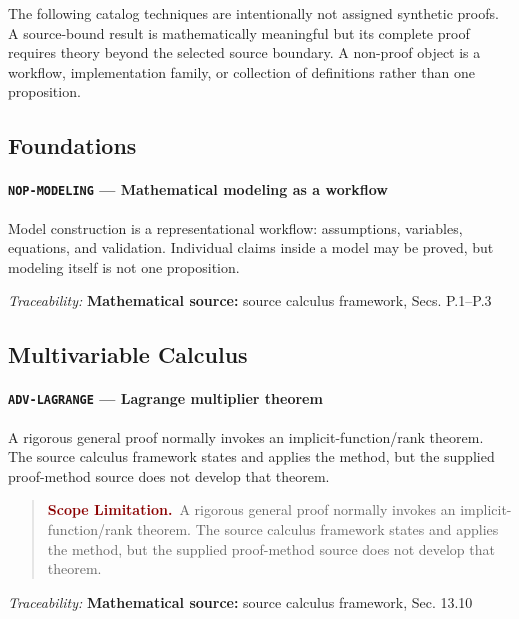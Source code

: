 \documentclass[10pt]{article}
\newcommand{\pidraw}[1]{\begingroup\urlstyle{tt}\nolinkurl{#1}\endgroup}
\theoremstyle{definition}
\theoremstyle{remark}
\newenvironment{scopelimitation}
{\begin{quote}\small\noindent\textbf{\textcolor{darkred}{Scope Limitation.}}\ }
{\end{quote}}
\begin{document}
The following catalog techniques are intentionally not assigned synthetic proofs. A source-bound result is mathematically meaningful but its complete proof requires theory beyond the selected source boundary. A non-proof object is a workflow, implementation family, or collection of definitions rather than one proposition.

\subsection{Foundations}

\label{prf:NOP-MODELING}

\paragraph{\pidraw{NOP-MODELING} --- Mathematical modeling as a workflow}

Model construction is a representational workflow: assumptions, variables, equations, and validation. Individual claims inside a model may be proved, but modeling itself is not one proposition.

\smallskip\noindent\textit{Traceability:} \textbf{Mathematical source:} source calculus framework, Secs. P.1--P.3\par

\subsection{Multivariable Calculus}

\label{prf:ADV-LAGRANGE}

\paragraph{\pidraw{ADV-LAGRANGE} --- Lagrange multiplier theorem}

A rigorous general proof normally invokes an implicit-function/rank theorem. The source calculus framework states and applies the method, but the supplied proof-method source does not develop that theorem.

\begin{scopelimitation}A rigorous general proof normally invokes an implicit-function/rank theorem. The source calculus framework states and applies the method, but the supplied proof-method source does not develop that theorem.\end{scopelimitation}

\smallskip\noindent\textit{Traceability:} \textbf{Mathematical source:} source calculus framework, Sec. 13.10\par
\end{document}
